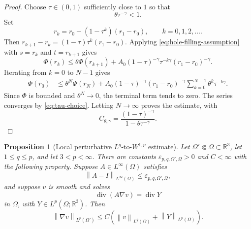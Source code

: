 \documentclass[11pt]{amsart}
\numberwithin{equation}{section}
\newtheorem{proposition}[theorem]{Proposition}
\theoremstyle{definition}
\newcommand{\R}{\mathbb R}
\newcommand{\eps}{\varepsilon}
\newcommand{\divE}{\operatorname{div}}
\newcommand{\norm}[1]{\left\lVert #1\right\rVert}
\begin{document}
\begin{proof}
Choose $\tau\in(0,1)$ sufficiently close to $1$ so that
\begin{equation}\label{eq:tau-choice}
        \theta\tau^{-\gamma}<1.
\end{equation}
Set
$$
        r_k=r_0+(1-\tau^k)(r_1-r_0),
        \qquad k=0,1,2,\ldots.
$$
Then $r_{k+1}-r_k=(1-\tau)\tau^k(r_1-r_0)$.  Applying \eqref{eq:hole-filling-assumption} with $s=r_k$ and $t=r_{k+1}$ gives
$$
        \Phi(r_k)
        \le \theta\Phi(r_{k+1})
        +A_0(1-\tau)^{-\gamma}\tau^{-k\gamma}(r_1-r_0)^{-\gamma}.
$$
Iterating from $k=0$ to $N-1$ gives
$$
\begin{aligned}
        \Phi(r_0)
        &\le \theta^N\Phi(r_N)
        +A_0(1-\tau)^{-\gamma}(r_1-r_0)^{-\gamma}
          \sum_{k=0}^{N-1}\theta^k\tau^{-k\gamma}.
\end{aligned}
$$
Since $\Phi$ is bounded and $\theta^N\to0$, the terminal term tends to zero.  The series converges by \eqref{eq:tau-choice}.  Letting $N\to\infty$ proves the estimate, with
$$
        C_{\theta,\gamma}=\frac{(1-\tau)^{-\gamma}}{1-\theta\tau^{-\gamma}}.
$$
\end{proof}

\begin{proposition}[Local perturbative $L^q$-to-$W^{1,p}$ estimate]\label{prop:elliptic-perturbative-full}
Let $\Omega'\Subset\Omega\subset\R^3$, let $1\le q\le p$, and let $3<p<\infty$.  There are constants $\eps_{p,q,\Omega',\Omega}>0$ and $C<\infty$ with the following property.  Suppose $A\in L^\infty(\Omega)$ satisfies
$$
        \norm{A-I}_{L^\infty(\Omega)}\le \eps_{p,q,\Omega',\Omega},
$$
and suppose $v$ is smooth and solves
$$
        \divE(A\nabla v)=\divE Y
$$
in $\Omega$, with $Y\in L^p(\Omega;\R^3)$.  Then
\begin{equation}\label{eq:perturbative-full-estimate}
        \norm{\nabla v}_{L^p(\Omega')}
        \le C\left(\norm{v}_{L^q(\Omega)}+\norm{Y}_{L^p(\Omega)}\right).
\end{equation}
\end{proposition}
\end{document}
